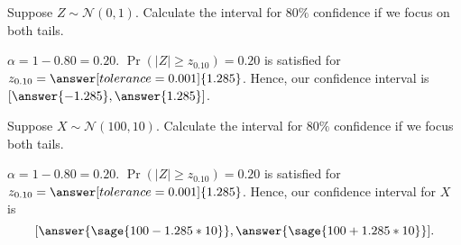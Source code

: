 \documentclass{ximera}
\begin{document}
\begin{problem}
Suppose $Z\sim \mathcal N(0,1)$. Calculate the interval for $80\%$ confidence if we focus on both tails. 
\begin{explanation}
$\alpha=1-0.80=0.20$.
$\Pr(|Z|\geq z_{0.10})=0.20$ is satisfied for $z_{0.10}=\answer[tolerance=0.001]{1.285}$. Hence, our confidence interval is $[\answer{-1.285},\answer{1.285}]$. 

\end{explanation}
\end{problem}


\begin{problem}
Suppose $X\sim \mathcal N(100,10)$. Calculate the interval for $80\%$ confidence if we focus both tails. 
\begin{explanation}
$\alpha=1-0.80=0.20$.
$\Pr(|Z|\geq z_{0.10})=0.20$ is satisfied for $z_{0.10}=\answer[tolerance=0.001]{1.285}$. Hence, our confidence interval  for $X$ is
$$[\answer{\sage{100-1.285*10}},\answer{\sage{100+1.285*10}}].$$

\end{explanation}
\end{problem}
\end{document}
